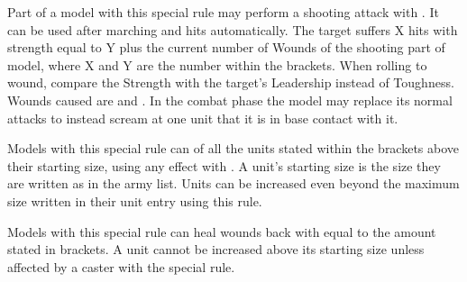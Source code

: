 

Part of a model with this special rule may perform a shooting  attack with . It can be used after marching and hits automatically. The target suffers X hits with strength equal to Y plus the current number of Wounds of the shooting part of model, where X and Y are the number within the brackets. When rolling to wound, compare the Strength with the target's Leadership instead of Toughness. Wounds caused are  and \magicalattacks . In the combat phase the model may replace its normal attacks to instead scream at one unit that it is in base contact with it.


Models with this special rule can \raisewounds of all the units stated within the brackets above their starting size, using any effect with \raisewounds . A unit's starting size is the size they are written as in the army list. Units can be increased even beyond the maximum size written in their unit entry using this rule.


Models with this special rule can heal wounds back with \necromancysignaturespell equal to the amount stated in brackets. A unit cannot be increased above its starting size unless affected by a caster with the \awaken{} special rule.

\armyspecialruleentry{\reaper}




